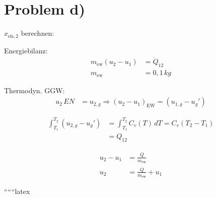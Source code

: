 \section*{Problem d)}

$x_{\text{eis},2}$ berechnen:

Energiebilanz:
\begin{align*}
    m_{\text{ew}} (u_2 - u_1) &= \dot{Q}_{12} \\
    m_{\text{ew}} &= 0{,}1 \, kg
\end{align*}

Thermodyn. GGW:
\begin{align*}
    u_2 \, EN &= u_{2,g} \Rightarrow (u_2 - u_1)_{\text{EW}} = (u_{1,g} - u_{g}')
\end{align*}

\begin{align*}
    \int_{T_1}^{T_2} (u_{2,g} - u_{g}') &= \int_{T_1}^{T_2} C_v(T) \, dT = C_v (T_2 - T_1) \\
    &= Q_{12}
\end{align*}

\begin{align*}
    u_2 - u_1 &= \frac{\dot{Q}}{m_{\text{ew}}} \\
    u_2 &= \frac{\dot{Q}}{m_{\text{ew}}} + u_1
\end{align*}

``````latex
